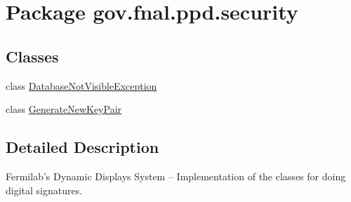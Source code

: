 \hypertarget{namespacegov_1_1fnal_1_1ppd_1_1security}{\section{Package gov.\-fnal.\-ppd.\-security}
\label{namespacegov_1_1fnal_1_1ppd_1_1security}
}
\subsection*{Classes}
\begin{DoxyCompactItemize}
\item 
class \hyperlink{classgov_1_1fnal_1_1ppd_1_1security_1_1DatabaseNotVisibleException}{Database\-Not\-Visible\-Exception}
\item 
class \hyperlink{classgov_1_1fnal_1_1ppd_1_1security_1_1GenerateNewKeyPair}{Generate\-New\-Key\-Pair}
\end{DoxyCompactItemize}


\subsection{Detailed Description}
Fermilab's Dynamic Displays System -- Implementation of the classes for doing digital signatures.